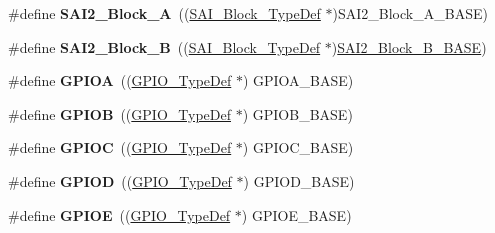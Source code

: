 \begin{DoxyCompactItemize}
\#define {\bfseries S\+A\+I2\+\_\+\+Block\+\_\+A}~((\mbox{\hyperlink{struct_s_a_i___block___type_def}{S\+A\+I\+\_\+\+Block\+\_\+\+Type\+Def}} $\ast$)S\+A\+I2\+\_\+\+Block\+\_\+\+A\+\_\+\+B\+A\+SE)
\item 
\mbox{\label{group___peripheral__declaration_ga95b7e0dbc95a105899223988e999c799}} 
\#define {\bfseries S\+A\+I2\+\_\+\+Block\+\_\+B}~((\mbox{\hyperlink{struct_s_a_i___block___type_def}{S\+A\+I\+\_\+\+Block\+\_\+\+Type\+Def}} $\ast$)\mbox{\hyperlink{group___peripheral__memory__map_ga034a6ac8f61e4d15cd9f2f7eca140569}{S\+A\+I2\+\_\+\+Block\+\_\+\+B\+\_\+\+B\+A\+SE}})
\item 
\mbox{\label{group___peripheral__declaration_gac485358099728ddae050db37924dd6b7}} 
\#define {\bfseries G\+P\+I\+OA}~((\mbox{\hyperlink{struct_g_p_i_o___type_def}{G\+P\+I\+O\+\_\+\+Type\+Def}} $\ast$) G\+P\+I\+O\+A\+\_\+\+B\+A\+SE)
\item 
\mbox{\label{group___peripheral__declaration_ga68b66ac73be4c836db878a42e1fea3cd}} 
\#define {\bfseries G\+P\+I\+OB}~((\mbox{\hyperlink{struct_g_p_i_o___type_def}{G\+P\+I\+O\+\_\+\+Type\+Def}} $\ast$) G\+P\+I\+O\+B\+\_\+\+B\+A\+SE)
\item 
\mbox{\label{group___peripheral__declaration_ga2dca03332d620196ba943bc2346eaa08}} 
\#define {\bfseries G\+P\+I\+OC}~((\mbox{\hyperlink{struct_g_p_i_o___type_def}{G\+P\+I\+O\+\_\+\+Type\+Def}} $\ast$) G\+P\+I\+O\+C\+\_\+\+B\+A\+SE)
\item 
\mbox{\label{group___peripheral__declaration_ga7580b1a929ea9df59725ba9c18eba6ac}} 
\#define {\bfseries G\+P\+I\+OD}~((\mbox{\hyperlink{struct_g_p_i_o___type_def}{G\+P\+I\+O\+\_\+\+Type\+Def}} $\ast$) G\+P\+I\+O\+D\+\_\+\+B\+A\+SE)
\item 
\mbox{\label{group___peripheral__declaration_gae04bdb5e8acc47cab1d0532e6b0d0763}} 
\#define {\bfseries G\+P\+I\+OE}~((\mbox{\hyperlink{struct_g_p_i_o___type_def}{G\+P\+I\+O\+\_\+\+Type\+Def}} $\ast$) G\+P\+I\+O\+E\+\_\+\+B\+A\+SE)
\item 
\mbox{\label{group___peripheral__declaration_ga43c3022dede7c9db7a58d3c3409dbc8d}} 

\end{DoxyCompactItemize}
